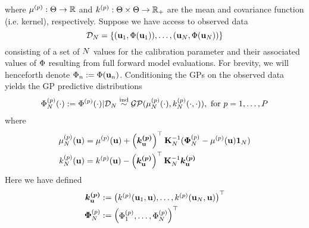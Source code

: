 \documentclass[12pt]{article}
\begin{document}
where $\GPMeanOut{\objIdx}: \parSpace \to \R$ and $\GPKerOut{\objIdx}: \parSpace \times \parSpace \to \R_+$ are the mean and covariance function (i.e. kernel), respectively. 
Suppose we have access to observed data 
\[\designData_{\Ndesign} = \left\{(\bpar_1, \SSR(\bpar_1)), \dots, (\bpar_{\Ndesign}, \SSR(\bpar_{\Ndesign})) \right\}\]
consisting of a set of $\Ndesign$ values for the calibration parameter and their associated values of $\SSR$ resulting from full forward model evaluations. For brevity, we will henceforth denote 
$\SSR_{\designIdx} := \SSR(\bpar_{\designIdx})$. Conditioning the GPs on the observed data yields the GP predictive distributions
\begin{align} 
\indexDesignObj{\SSR}{\Ndesign}(\cdot) := \indexObj{\SSR}(\cdot)|\designData_{\Ndesign} \overset{\text{ind}}{\sim} \GP(\GPMeanPredOut{\Ndesign}{\objIdx}(\cdot), \GPKerPredOut{\Ndesign}{\objIdx}(\cdot, \cdot)), \text{ for } \objIdx = 1, \dots, \Nobj
\end{align}
where 
\begin{align}
\GPMeanPredOut{\Ndesign}{\objIdx}(\bpar) &= \GPMeanOut{\objIdx}(\bpar) + \left(\boldsymbol{\GPKerOut{\objIdx}_{\bpar}}\right)^\top \KerMat[\Ndesign]^{-1} (\SSRVecPredOut{\Ndesign}{\objIdx} - \GPMeanOut{\objIdx}(\bpar) \oneVec{\Ndesign}) \label{GP_pred_mean} \\ 
\GPKerPredOut{\Ndesign}{\objIdx}(\bpar) &= \GPKerOut{\objIdx}(\bpar) - \left(\boldsymbol{\GPKerOut{\objIdx}_{\bpar}}\right)^\top \KerMat[\Ndesign]^{-1} \boldsymbol{\GPKerOut{\objIdx}_{\bpar}} \label{GP_pred_var}
\end{align}
Here we have defined 
\begin{align}
\boldsymbol{\GPKerOut{\objIdx}_{\bpar}} &:= \begin{pmatrix} \GPKerOut{\objIdx}(\bpar_1, \bpar), \dots, \GPKerOut{\objIdx}(\bpar_{\Ndesign}, \bpar)  \end{pmatrix}^\top \\ 
\SSRVecPredOut{\Ndesign}{\objIdx} &:= \begin{pmatrix} \indexDesignObj{\SSR}{1}, \dots, \indexDesignObj{\SSR}{\Ndesign} \end{pmatrix}^{\top}
\end{align}



\end{document}
